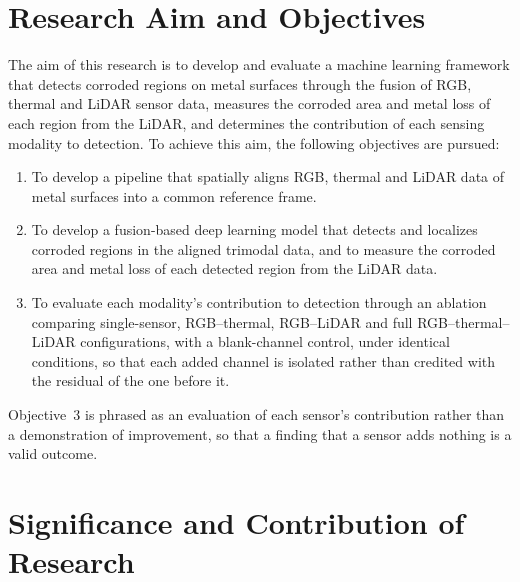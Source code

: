 \section{Research Aim and Objectives}
\label{sec:aim-objectives}

The aim of this research is to develop and evaluate a machine learning
framework that detects corroded regions on metal surfaces through the fusion
of RGB, thermal and LiDAR sensor data, measures the corroded area and metal
loss of each region from the LiDAR, and determines the contribution of each
sensing modality to detection. To achieve this aim, the following objectives
are pursued:

\begin{enumerate}[label=\arabic*),leftmargin=*,itemsep=6pt]
  \item To develop a pipeline that spatially aligns RGB, thermal and LiDAR
        data of metal surfaces into a common reference frame.
  \item To develop a fusion-based deep learning model that detects and
        localizes corroded regions in the aligned trimodal data, and to
        measure the corroded area and metal loss of each detected region from
        the LiDAR data.
  \item To evaluate each modality's contribution to detection through an
        ablation comparing single-sensor, RGB--thermal, RGB--LiDAR and full
        RGB--thermal--LiDAR configurations, with a blank-channel control,
        under identical conditions, so that each added channel is isolated
        rather than credited with the residual of the one before it.
\end{enumerate}

Objective~3 is phrased as an evaluation of each sensor's contribution rather
than a demonstration of improvement, so that a finding that a sensor adds
nothing is a valid outcome.


\section{Significance and Contribution of Research}
\label{sec:significance}

